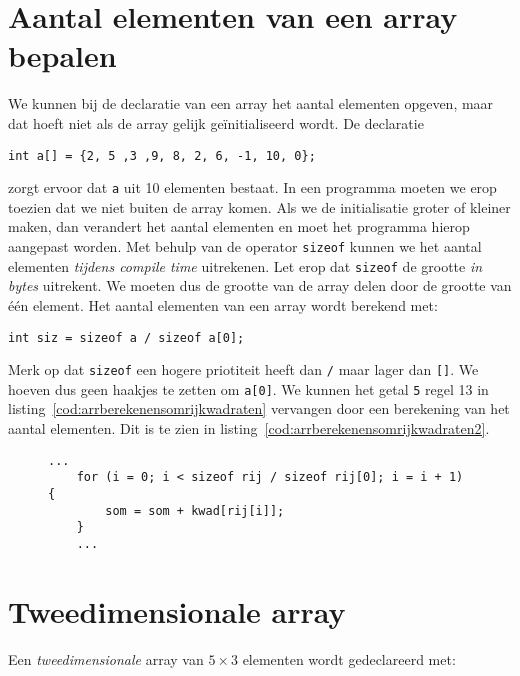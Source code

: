 \section{Aantal elementen van een array bepalen}
We kunnen bij de declaratie van een array het aantal elementen opgeven, maar dat hoeft niet als de array gelijk geïnitialiseerd wordt. De declaratie

\hspace*{1em}\texttt{int a[] = \{2, 5 ,3 ,9, 8, 2, 6, -1, 10, 0\};}

zorgt ervoor dat \texttt{a} uit 10 elementen bestaat. In een programma moeten we erop toezien dat we niet buiten de array komen. Als we de initialisatie groter of kleiner maken, dan verandert het aantal elementen en moet het programma hierop aangepast worden. Met behulp van de operator \texttt{sizeof} kunnen we het aantal elementen \textsl{tijdens compile time} uitrekenen. Let erop dat \texttt{sizeof} de grootte \textsl{in bytes} uitrekent. We moeten dus de grootte van de array delen door de grootte van één element. Het aantal elementen van een array wordt berekend met:

\hspace*{1em}\texttt{int siz = sizeof a / sizeof a[0];}

Merk op dat \texttt{sizeof} een hogere priotiteit heeft dan \texttt{/} maar lager dan \texttt{[]}. We hoeven dus geen haakjes te zetten om \texttt{a[0]}. We kunnen het getal \texttt{5} regel 13 in listing~\ref{cod:arrberekenensomrijkwadraten} vervangen door een berekening van het aantal elementen. Dit is te zien in listing~\ref{cod:arrberekenensomrijkwadraten2}.

\begin{figure}[!ht]
\begin{lstlisting}[caption=Bepalen van het aantal elementen in een array.,label=cod:arrberekenensomrijkwadraten2]
    ...
    for (i = 0; i < sizeof rij / sizeof rij[0]; i = i + 1) {
        som = som + kwad[rij[i]];
    }
    ...
\end{lstlisting}
\end{figure}



\section{Tweedimensionale array}
Een \textsl{tweedimensionale} array van $5\times3$ elementen wordt gedeclareerd met:

